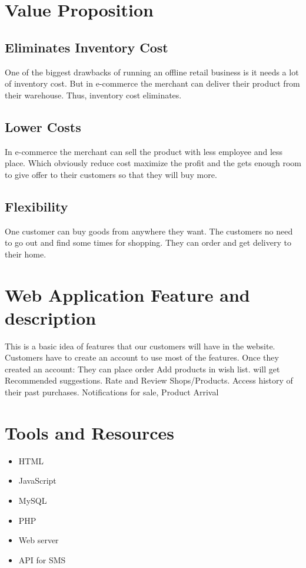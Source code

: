 \documentclass{article}
\begin{document}
\section{Value Proposition}

\subsection{Eliminates Inventory Cost}
One of the biggest drawbacks of running an offline retail business is it needs a lot of inventory cost. But in e-commerce the merchant can deliver their product from their warehouse. Thus, inventory cost eliminates. 

\subsection{Lower Costs}
In e-commerce the merchant can sell the product with less employee and less place. Which obviously reduce cost maximize the profit and the gets enough room to give offer to their customers so that they will buy more. 

\subsection{Flexibility}
One customer can buy goods from anywhere they want. The customers no need to go out and find some times for shopping. They can order and get delivery to their home.



\section{Web Application Feature and description}

This is a basic idea of features that our customers will have in the website. Customers have to create an account to use most of the features. Once they created an account: They can place order Add products in wish list. will get Recommended suggestions. Rate and Review Shops/Products. Access history of their past purchases. Notifications for sale, Product Arrival

\section{Tools and Resources}
\begin{itemize}
\item HTML
\item JavaScript
\item MySQL
\item PHP
\item Web server
\item API for SMS
\end{itemize}
\end{document}
